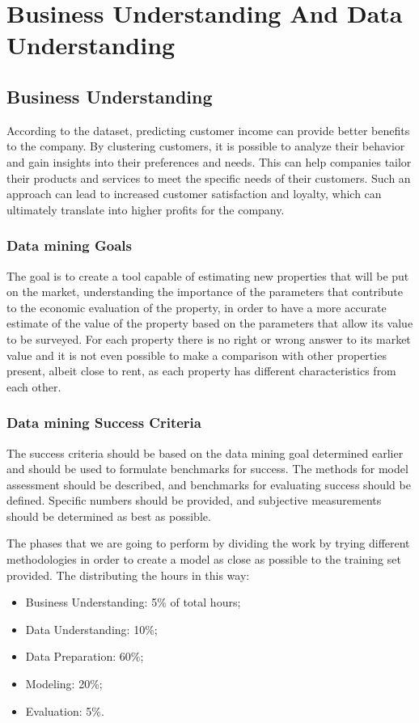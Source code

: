 \chapter{Business Understanding And Data Understanding}
\section{Business Understanding}

According to the dataset, predicting customer income can provide better benefits to the company. By clustering customers, it is possible to analyze their behavior and gain insights into their preferences and needs. This can help companies tailor their products and services to meet the specific needs of their customers. Such an approach can lead to increased customer satisfaction and loyalty, which can ultimately translate into higher profits for the company. 

\subsection{Data mining Goals}
The goal is to create a tool capable of estimating new properties that will be put on the market, understanding the importance of the parameters that contribute to the economic evaluation of the property, in order to have a more accurate estimate of the value of the property based on the parameters that allow its value to be surveyed. For each property there is no right or wrong answer to its market value and it is not even possible to make a comparison with other properties present, albeit close to rent, as each property has different characteristics from each other.

\subsection{Data mining Success Criteria}
The success criteria should be based on the data mining goal determined earlier and should be used to formulate benchmarks for success. The methods for model assessment should be described, and benchmarks for evaluating success should be defined. Specific numbers should be provided, and subjective measurements should be determined as best as possible. 

The phases that we are going to perform by dividing the work by trying different methodologies in order to create a model as close as possible to the training set provided.
The distributing the hours in this way:
\begin{itemize}
\item Business Understanding: 5\% of total hours;
\item Data Understanding: 10\%;
\item Data Preparation: 60\%; 
\item Modeling: 20\%;
\item Evaluation: 5\%.
\end{itemize}

